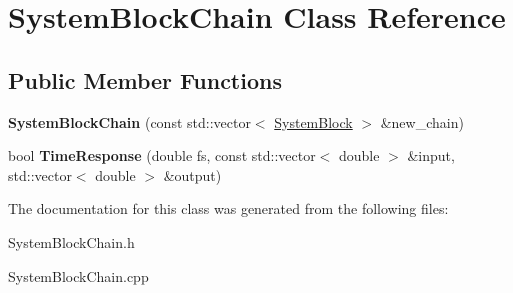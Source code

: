 \hypertarget{classSystemBlockChain}{}\section{System\+Block\+Chain Class Reference}
\label{classSystemBlockChain}
\subsection*{Public Member Functions}
\begin{DoxyCompactItemize}
\item 
\mbox{\label{classSystemBlockChain_a55512b16ad12692b8cf19b7998264dc5}} 
{\bfseries System\+Block\+Chain} (const std\+::vector$<$ \hyperlink{classSystemBlock}{System\+Block} $>$ \&new\+\_\+chain)
\item 
\mbox{\label{classSystemBlockChain_a1862e5e9f5080db8f37ea5c1c65cd6dd}} 
bool {\bfseries Time\+Response} (double fs, const std\+::vector$<$ double $>$ \&input, std\+::vector$<$ double $>$ \&output)
\end{DoxyCompactItemize}


The documentation for this class was generated from the following files\+:\begin{DoxyCompactItemize}
\item 
System\+Block\+Chain.\+h\item 
System\+Block\+Chain.\+cpp\end{DoxyCompactItemize}
